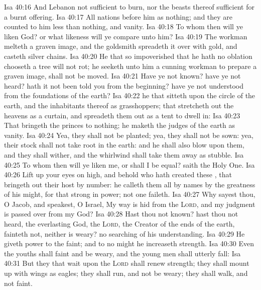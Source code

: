 \vs Isa 40:16 And Lebanon  not sufficient to burn, nor the beasts thereof sufficient for a burnt offering.
\vs Isa 40:17 All nations before him  as nothing; and they are counted to him less than nothing, and vanity.
\vs Isa 40:18 To whom then will ye liken God? or what likeness will ye compare unto him?
\vs Isa 40:19 The workman melteth a graven image, and the goldsmith spreadeth it over with gold, and casteth silver chains.
\vs Isa 40:20 He that  so impoverished that he hath no oblation chooseth a tree  will not rot; he seeketh unto him a cunning workman to prepare a graven image,  shall not be moved.
\vs Isa 40:21 Have ye not known? have ye not heard? hath it not been told you from the beginning? have ye not understood from the foundations of the earth?
\vs Isa 40:22  he that sitteth upon the circle of the earth, and the inhabitants thereof  as grasshoppers; that stretcheth out the heavens as a curtain, and spreadeth them out as a tent to dwell in:
\vs Isa 40:23 That bringeth the princes to nothing; he maketh the judges of the earth as vanity.
\vs Isa 40:24 Yea, they shall not be planted; yea, they shall not be sown: yea, their stock shall not take root in the earth: and he shall also blow upon them, and they shall wither, and the whirlwind shall take them away as stubble.
\vs Isa 40:25 To whom then will ye liken me, or shall I be equal? saith the Holy One.
\vs Isa 40:26 Lift up your eyes on high, and behold who hath created these , that bringeth out their host by number: he calleth them all by names by the greatness of his might, for that  strong in power; not one faileth.
\vs Isa 40:27 Why sayest thou, O Jacob, and speakest, O Israel, My way is hid from the \textsc{Lord}, and my judgment is passed over from my God?
\vs Isa 40:28 Hast thou not known? hast thou not heard,  the everlasting God, the \textsc{Lord}, the Creator of the ends of the earth, fainteth not, neither is weary?  no searching of his understanding.
\vs Isa 40:29 He giveth power to the faint; and to  no might he increaseth strength.
\vs Isa 40:30 Even the youths shall faint and be weary, and the young men shall utterly fall:
\vs Isa 40:31 But they that wait upon the \textsc{Lord} shall renew  strength; they shall mount up with wings as eagles; they shall run, and not be weary;  they shall walk, and not faint.
